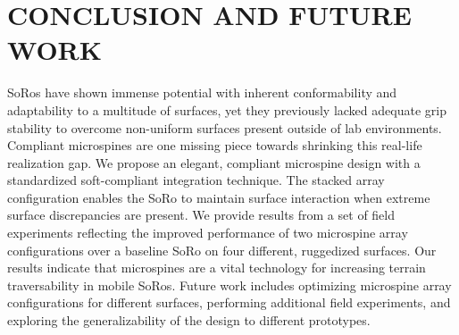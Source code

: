 \section{CONCLUSION AND FUTURE WORK}
SoRos have shown immense potential with inherent conformability and adaptability to a multitude of surfaces, yet they previously lacked adequate grip stability to overcome non-uniform surfaces present outside of lab environments. Compliant microspines are one missing piece towards shrinking this real-life realization gap. We propose an elegant, compliant microspine design with a standardized soft-compliant integration technique. The stacked array configuration enables the SoRo to maintain surface interaction when extreme surface discrepancies are present. We provide results from a set of field experiments reflecting the improved performance of two microspine array configurations over a baseline SoRo on four different, ruggedized surfaces. %
Our results indicate that microspines are a vital technology for increasing terrain traversability in mobile SoRos. Future work includes optimizing microspine array configurations for different surfaces, performing additional field experiments, and exploring the generalizability of the design to different prototypes.





